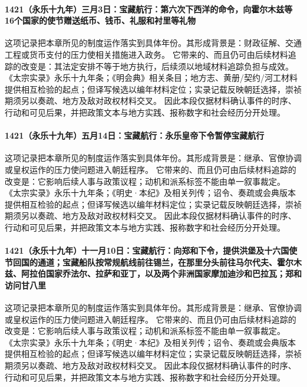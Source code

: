 \paragraph{1421（永乐十九年）三月3日：宝藏航行：第六次下西洋的命令，向霍尔木兹等16个国家的使节赠送纸币、钱币、礼服和衬里等礼物} 这项记录把本章所见的制度运作落实到具体年份。其形成背景是：财政征解、交通工程或货币支付的压力使相关措施进入政务。 它带来的、而且仍可由后续材料追踪的改变是：其法定安排不等于地方执行，后续须以地域材料追踪负担与成效。 《太宗实录》永乐十九年条；《明会典》相关条目；地方志、黄册/契约/河工材料 提供相互检验的起点；但译写候选以编年材料定位；实录记载反映朝廷选择，崇祯期须另以奏疏、地方及敌对政权材料交叉。 因此本段仅据材料确认事件的时序、行动和可见后果，并把政策文本与地方实践、报称数字和社会经历分开处理。

\paragraph{1421（永乐十九年）五月14日：宝藏航行：永乐皇帝下令暂停宝藏航行} 这项记录把本章所见的制度运作落实到具体年份。其形成背景是：继承、官僚协调或皇权运作的压力使问题进入朝廷程序。 它带来的、而且仍可由后续材料追踪的改变是：它影响后续人事与政策议程；动机和派系标签不能由单一叙事裁定。 《太宗实录》永乐十九年条；《明史·本纪》及相关列传；诏令、奏疏或会典版本 提供相互检验的起点；但译写候选以编年材料定位；实录记载反映朝廷选择，崇祯期须另以奏疏、地方及敌对政权材料交叉。 因此本段仅据材料确认事件的时序、行动和可见后果，并把政策文本与地方实践、报称数字和社会经历分开处理。

\paragraph{1421（永乐十九年）十一月10日：宝藏航行：向郑和下令，提供洪堡及十六国使节回国的通道；宝藏船队按常规航线前往锡兰，在那里分头前往马尔代夫、霍尔木兹、阿拉伯国家乔法尔、拉萨和亚丁，以及两个非洲国家摩加迪沙和巴拉瓦；郑和访问甘八里} 这项记录把本章所见的制度运作落实到具体年份。其形成背景是：继承、官僚协调或皇权运作的压力使问题进入朝廷程序。 它带来的、而且仍可由后续材料追踪的改变是：它影响后续人事与政策议程；动机和派系标签不能由单一叙事裁定。 《太宗实录》永乐十九年条；《明史·本纪》及相关列传；诏令、奏疏或会典版本 提供相互检验的起点；但译写候选以编年材料定位；实录记载反映朝廷选择，崇祯期须另以奏疏、地方及敌对政权材料交叉。 因此本段仅据材料确认事件的时序、行动和可见后果，并把政策文本与地方实践、报称数字和社会经历分开处理。


